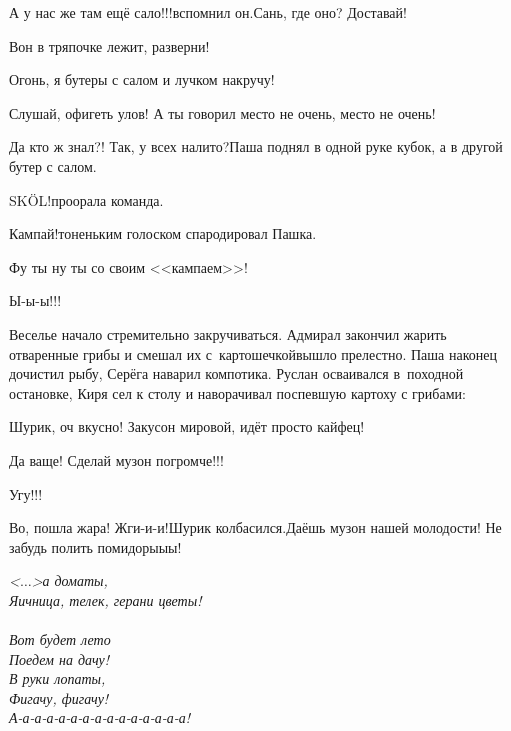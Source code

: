 \diagdash А у нас же там ещё сало!!!\mdash вспомнил он.\mdash Сань, где оно? Доставай!

\diagdash Вон в тряпочке лежит, разверни!

\diagdash Огонь, я бутеры с салом и лучком накручу!

\diagdash Слушай, офигеть улов! А ты говорил место не очень, место не очень!

\diagdash Да кто ж знал?! Так, у всех налито?\mdash Паша поднял в одной руке кубок, а в другой бутер с салом.

\diagdash SK{\"O}L!\mdash проорала команда.

\diagdash Кампай!\mdash тоненьким голоском спародировал Пашка.

\diagdash Фу ты ну ты со своим <<кампаем>>!

\diagdash Ы-ы-ы!!!

Веселье начало стремительно закручиваться. Адмирал закончил жарить отваренные грибы и смешал их с~картошечкой\mdash вышло прелестно. Паша наконец дочистил рыбу, Серёга наварил компотика. Руслан осваивался в~походной остановке, Киря сел к столу и наворачивал поспевшую картоху с грибами:

\diagdash Шурик, оч вкусно! Закусон мировой, идёт просто кайфец!

\diagdash Да ваще! Сделай музон погромче!!!

\diagdash Угу!!!

\diagdash Во, пошла жара! Жги-и-и!\mdash Шурик колбасился.\mdash Даёшь музон нашей молодости! Не забудь полить помидоры\sdash ы\sdash ы!

\vspace{0.2cm}
\noindent\textit{%
	\hspace*{3.4cm}<$\ldots$>а дома\mdash ты,\\
	\hspace*{3.4cm}Яичница, телек, герани цветы!\\
	\\
	\hspace*{3.4cm}Вот будет лето\mdash\\
	\hspace*{3.4cm}Поедем на дачу!\\
	\hspace*{3.4cm}В руки лопаты,\\
	\hspace*{3.4cm}Фигачу, фигачу!\\	
	\hspace*{3.4cm}А-а-а-а-а-а-а-а-а-а-а-а-а-а-а!\mdash	
}
\vspace{0.2cm}

